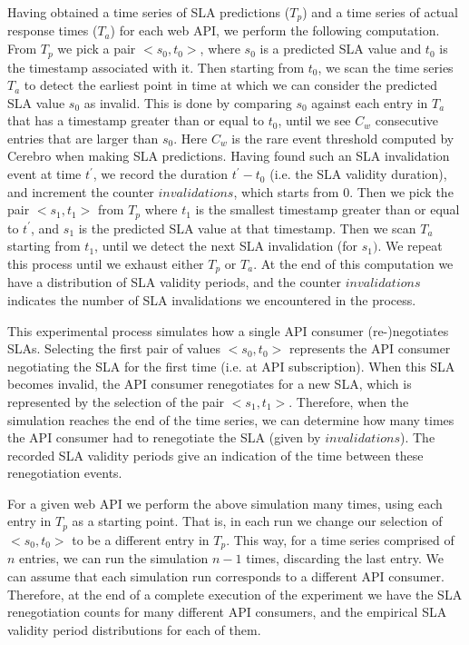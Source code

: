 Having obtained a time series of SLA predictions ($T_{p}$) and a time series of actual response 
times ($T_{a}$) for each web API, we perform the following computation. From $T_{p}$ we pick a
pair $<s_{0},t_{0}>$, where $s_{0}$ is a predicted SLA value and $t_{0}$ is the timestamp associated with it. 
Then starting from $t_{0}$, we scan the time series $T_{a}$ to detect the earliest point in time
at which we can consider the predicted SLA value $s_{0}$ as invalid. This is done by comparing $s_{0}$
against each entry in $T_{a}$ that has a timestamp greater than or equal to $t_{0}$, until we see $C_{w}$ 
consecutive entries that are larger than $s_{0}$. Here $C_{w}$ is the rare event threshold 
computed by Cerebro when making SLA predictions. Having found such an SLA invalidation
event at time $t^{\prime}$, we record the duration $t^{\prime} - t_{0}$ (i.e. the SLA validity duration), and 
increment the counter $invalidations$, 
which starts from $0$. Then we pick the pair $<s_{1},t_{1}>$ from $T_{p}$ where $t_{1}$ is the smallest
timestamp greater than or equal to $t^{\prime}$, and $s_{1}$ is the predicted SLA value at that timestamp.
Then we scan $T_{a}$ starting from $t_{1}$, until we detect the next SLA invalidation (for $s_{1})$. 
We repeat this process
until we exhaust either $T_{p}$ or $T_{a}$. At the end of this computation we have a distribution of SLA
validity periods, and the counter $invalidations$ indicates the number of SLA invalidations we encountered
in the process.

This experimental process simulates how a single API consumer (re-)negotiates SLAs.
Selecting the first pair of values $<s_{0},t_{0}>$ represents
the API consumer negotiating the SLA for the first time (i.e. at API subscription). 
When this SLA becomes invalid, the API consumer
renegotiates for a new SLA, which is represented by the selection of the pair $<s_{1},t_{1}>$. 
Therefore, when the simulation reaches the end of the time series, we can determine how many times the
API consumer had to renegotiate the SLA (given by $invalidations$). The
recorded SLA validity periods give an indication of the time between these renegotiation events.

For a given web API we perform the above simulation many times, using each entry in $T_{p}$ as
a starting point. That is, in each run we change our selection of $<s_{0},t_{0}>$ to be a different
entry in $T_{p}$. This way, for a time series comprised of $n$ entries, we can run the simulation 
$n-1$ times, discarding the last entry. We can assume that each simulation run corresponds to a different API
consumer. Therefore, at the end of a complete execution of the experiment we have the SLA
renegotiation counts for many different API consumers, and the empirical SLA validity period distributions 
for each of them. 


